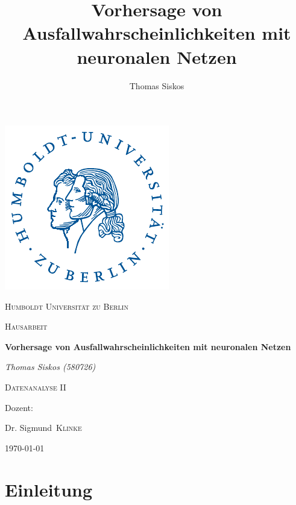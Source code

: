 \documentclass{article}
\title{Vorhersage von Ausfallwahrscheinlichkeiten mit neuronalen Netzen}
\author{Thomas Siskos}
\date{ }
\begin{document}
\begin{titlepage}
  \begin{center}

  \includegraphics[scale=1.25]{hulogo.pdf} \par
  {\scshape\LARGE Humboldt Universit{\"a}t zu Berlin \par}

  {\scshape\Large Hausarbeit\par}

  {\huge\bfseries Vorhersage von Ausfallwahrscheinlichkeiten mit neuronalen Netzen\par}

\vspace{1cm}

  {\Large\itshape Thomas Siskos (580726)\par}

  {\Large\scshape Datenanalyse II\par}

  \vfill
  Dozent: \par
  {\Large Dr. Sigmund~\scshape Klinke \par}
  \vfill
  {\large \today\par}
  \end{center}
\end{titlepage}

\tableofcontents
\listoftables
\listoffigures
\newpage
\section{Einleitung}
\end{document}
